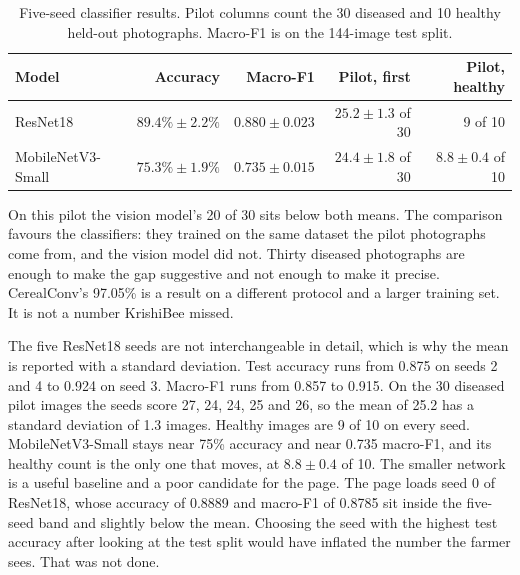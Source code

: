 \begin{table}[H]
\centering
\caption{Five-seed classifier results. Pilot columns count the 30 diseased and 10 healthy held-out photographs. Macro-F1 is on the 144-image test split.}
\label{tab:clf}
\small
\begin{tabular}{lrrrr}
\toprule
\textbf{Model} & \textbf{Accuracy} & \textbf{Macro-F1} & \textbf{Pilot, first} & \textbf{Pilot, healthy} \\
\midrule
ResNet18 & $89.4\% \pm 2.2\%$ & $0.880 \pm 0.023$ & $25.2 \pm 1.3$ of 30 & 9 of 10 \\
MobileNetV3-Small & $75.3\% \pm 1.9\%$ & $0.735 \pm 0.015$ & $24.4 \pm 1.8$ of 30 & $8.8 \pm 0.4$ of 10 \\
\bottomrule
\end{tabular}
\end{table}

On this pilot the vision model's 20 of 30 sits below both means. The comparison favours the classifiers: they trained on the same dataset the pilot photographs come from, and the vision model did not. Thirty diseased photographs are enough to make the gap suggestive and not enough to make it precise. CerealConv's 97.05\% \cite{long2023wheat} is a result on a different protocol and a larger training set. It is not a number KrishiBee missed.

The five ResNet18 seeds are not interchangeable in detail, which is why the mean is reported with a standard deviation. Test accuracy runs from 0.875 on seeds 2 and 4 to 0.924 on seed 3. Macro-F1 runs from 0.857 to 0.915. On the 30 diseased pilot images the seeds score 27, 24, 24, 25 and 26, so the mean of 25.2 has a standard deviation of 1.3 images. Healthy images are 9 of 10 on every seed. MobileNetV3-Small stays near 75\% accuracy and near 0.735 macro-F1, and its healthy count is the only one that moves, at $8.8 \pm 0.4$ of 10. The smaller network is a useful baseline and a poor candidate for the page. The page loads seed 0 of ResNet18, whose accuracy of 0.8889 and macro-F1 of 0.8785 sit inside the five-seed band and slightly below the mean. Choosing the seed with the highest test accuracy after looking at the test split would have inflated the number the farmer sees. That was not done.

